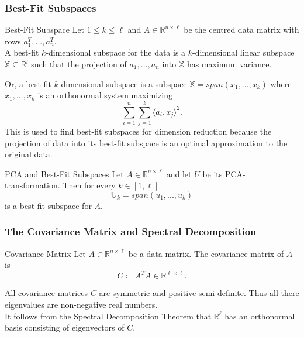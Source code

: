 \documentclass{panikzettel}
\begin{document}
\subsubsection{Best-Fit Subspaces}
\begin{defi}{Best-Fit Subspace}
Let $1\leq k\leq \ell$ and $A\in\mathbb{R}^{n\times\ell}$ be the centred data matrix with rows $a_1^T,...,a_n^T$.\\
A best-fit $k$-dimensional subspace for the data is a $k$-dimensional linear subspace $\mathbb{X} \subseteq \mathbb{R}^l$ such that the projection of $a_1,...,a_n$ into $\mathbb{X}$ has maximum variance.
\end{defi}
\begin{halfboxl}
\vspace{-\baselineskip}
	Or, a best-fit $k$-dimensional subspace is a subspace $\mathbb{X} = span(x_1,...,x_k)$ where $x_1,...,x_k$ is an orthonormal system maximizing
	\[
	\sum_{i=1}^n\sum_{j=1}^k \langle a_i, x_j\rangle^2.
	\]
	This is used to find best-fit subspaces for dimension reduction because the projection of data into its best-fit subspace is an optimal approximation to the original data.
\end{halfboxl}
\begin{halfboxr}
\vspace{-\baselineskip}
	\begin{theo}{PCA and Best-Fit Subspaces}
	Let $A\in\mathbb{R}^{n\times \ell}$ and let $U$ be its PCA-transformation. Then for every $k\in [1,\ell]$
	\[
	\mathbb{U}_k=span(u_1,...,u_k)
	\]
	is a best fit subspace for $A$.
	\end{theo}
\end{halfboxr}


\subsubsection{The Covariance Matrix and Spectral Decomposition}
\begin{halfboxl}
\vspace{-\baselineskip}
	\begin{defi}{Covariance Matrix}
	Let $A\in\mathbb{R}^{n\times \ell}$ be a data matrix. The covariance matrix of $A$ is
	\[
	C\coloneqq A^TA\in\mathbb{R}^{\ell\times\ell}.
	\]
	\end{defi}
\end{halfboxl}
\begin{halfboxr}
\vspace{-\baselineskip}
	All covariance matrices $C$ are symmetric and positive semi-definite. Thus all there eigenvalues are non-negative real numbers.\\
	It follows from the Spectral Decomposition Theorem that $\mathbb{R}^\ell$ has an orthonormal basis consisting of eigenvectors of $C$.
\end{halfboxr}
\end{document}
